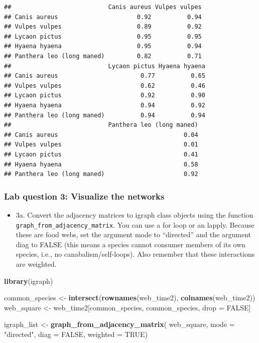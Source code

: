 \documentclass[
]{article}
\newenvironment{Shaded}{\begin{snugshade}}{\end{snugshade}}
\newcommand{\AttributeTok}[1]{\textcolor[rgb]{0.13,0.29,0.53}{#1}}
\newcommand{\ConstantTok}[1]{\textcolor[rgb]{0.56,0.35,0.01}{#1}}
\newcommand{\FunctionTok}[1]{\textcolor[rgb]{0.13,0.29,0.53}{\textbf{#1}}}
\newcommand{\NormalTok}[1]{#1}
\newcommand{\OtherTok}[1]{\textcolor[rgb]{0.56,0.35,0.01}{#1}}
\newcommand{\StringTok}[1]{\textcolor[rgb]{0.31,0.60,0.02}{#1}}
\providecommand{\tightlist}{%
  \setlength{\itemsep}{0pt}\setlength{\parskip}{0pt}}
\begin{document}
\begin{verbatim}
##                           Canis aureus Vulpes vulpes
## Canis aureus                      0.92          0.94
## Vulpes vulpes                     0.89          0.92
## Lycaon pictus                     0.95          0.95
## Hyaena hyaena                     0.95          0.94
## Panthera leo (long maned)         0.82          0.71
##                           Lycaon pictus Hyaena hyaena
## Canis aureus                       0.77          0.65
## Vulpes vulpes                      0.62          0.46
## Lycaon pictus                      0.92          0.90
## Hyaena hyaena                      0.94          0.92
## Panthera leo (long maned)          0.94          0.94
##                           Panthera leo (long maned)
## Canis aureus                                   0.04
## Vulpes vulpes                                  0.01
## Lycaon pictus                                  0.41
## Hyaena hyaena                                  0.58
## Panthera leo (long maned)                      0.92
\end{verbatim}

\subsubsection{Lab question 3: Visualize the
networks}\label{lab-question-3-visualize-the-networks}

\begin{itemize}
\tightlist
\item
  3a. Convert the adjacency matrices to igraph class objects using the
  function \texttt{graph\_from\_adjacency\_matrix}. You can use a for
  loop or an lapply. Because these are food webs, set the argument mode
  to ``directed'' and the argument diag to FALSE (this means a species
  cannot consumer members of its own species, i.e., no
  canabalism/self-loops). Also remember that these interactions are
  weighted.
\end{itemize}

\begin{Shaded}
\begin{Highlighting}[]
\FunctionTok{library}\NormalTok{(igraph)}

\NormalTok{common\_species }\OtherTok{\textless{}{-}} \FunctionTok{intersect}\NormalTok{(}\FunctionTok{rownames}\NormalTok{(web\_time2), }\FunctionTok{colnames}\NormalTok{(web\_time2))}
\NormalTok{web\_square }\OtherTok{\textless{}{-}}\NormalTok{ web\_time2[common\_species, common\_species, drop }\OtherTok{=} \ConstantTok{FALSE}\NormalTok{]}

\NormalTok{igraph\_list }\OtherTok{\textless{}{-}} \FunctionTok{graph\_from\_adjacency\_matrix}\NormalTok{(}
\NormalTok{  web\_square,}
   \AttributeTok{mode =} \StringTok{"directed"}\NormalTok{,}
      \AttributeTok{diag =} \ConstantTok{FALSE}\NormalTok{,}
        \AttributeTok{weighted =} \ConstantTok{TRUE}\NormalTok{)}
\end{Highlighting}
\end{Shaded}
\end{document}
